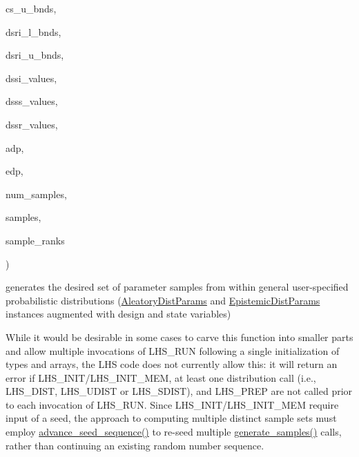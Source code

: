 {\begin{DoxyParamCaption}
\item[{const Real\+Vector \&}]{cs\+\_\+u\+\_\+bnds, }
\item[{const Int\+Vector \&}]{dsri\+\_\+l\+\_\+bnds, }
\item[{const Int\+Vector \&}]{dsri\+\_\+u\+\_\+bnds, }
\item[{const Int\+Set\+Array \&}]{dssi\+\_\+values, }
\item[{const String\+Set\+Array \&}]{dsss\+\_\+values, }
\item[{const Real\+Set\+Array \&}]{dssr\+\_\+values, }
\item[{const {\bf Aleatory\+Dist\+Params} \&}]{adp, }
\item[{const {\bf Epistemic\+Dist\+Params} \&}]{edp, }
\item[{int}]{num\+\_\+samples, }
\item[{Real\+Matrix \&}]{samples, }
\item[{Real\+Matrix \&}]{sample\+\_\+ranks}
\end{DoxyParamCaption}
)}\label{classPecos_1_1LHSDriver_a89134ad076d9b362b992f1c4d6beda0b}


generates the desired set of parameter samples from within general user-\/specified probabilistic distributions (\hyperlink{classPecos_1_1AleatoryDistParams}{Aleatory\+Dist\+Params} and \hyperlink{classPecos_1_1EpistemicDistParams}{Epistemic\+Dist\+Params} instances augmented with design and state variables) 

While it would be desirable in some cases to carve this function into smaller parts and allow multiple invocations of L\+H\+S\+\_\+\+R\+UN following a single initialization of types and arrays, the L\+HS code does not currently allow this\+: it will return an error if L\+H\+S\+\_\+\+I\+N\+I\+T/\+L\+H\+S\+\_\+\+I\+N\+I\+T\+\_\+\+M\+EM, at least one distribution call (i.\+e., L\+H\+S\+\_\+\+D\+I\+ST, L\+H\+S\+\_\+\+U\+D\+I\+ST or L\+H\+S\+\_\+\+S\+D\+I\+ST), and L\+H\+S\+\_\+\+P\+R\+EP are not called prior to each invocation of L\+H\+S\+\_\+\+R\+UN. Since L\+H\+S\+\_\+\+I\+N\+I\+T/\+L\+H\+S\+\_\+\+I\+N\+I\+T\+\_\+\+M\+EM require input of a seed, the approach to computing multiple distinct sample sets must employ \hyperlink{classPecos_1_1LHSDriver_a968dc84c7b328c0fde5435adfbcd4ae4}{advance\+\_\+seed\+\_\+sequence()} to re-\/seed multiple \hyperlink{classPecos_1_1LHSDriver_a89134ad076d9b362b992f1c4d6beda0b}{generate\+\_\+samples()} calls, rather than continuing an existing random number sequence. 

